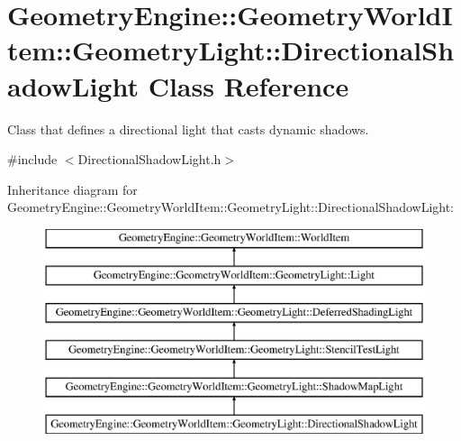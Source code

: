 \hypertarget{class_geometry_engine_1_1_geometry_world_item_1_1_geometry_light_1_1_directional_shadow_light}{}\section{Geometry\+Engine\+::Geometry\+World\+Item\+::Geometry\+Light\+::Directional\+Shadow\+Light Class Reference}
\label{class_geometry_engine_1_1_geometry_world_item_1_1_geometry_light_1_1_directional_shadow_light}


Class that defines a directional light that casts dynamic shadows.  




{\ttfamily \#include $<$Directional\+Shadow\+Light.\+h$>$}

Inheritance diagram for Geometry\+Engine\+::Geometry\+World\+Item\+::Geometry\+Light\+::Directional\+Shadow\+Light\+:\begin{figure}[H]
\begin{center}
\leavevmode
\includegraphics[height=6.000000cm]{class_geometry_engine_1_1_geometry_world_item_1_1_geometry_light_1_1_directional_shadow_light}
\end{center}
\end{figure}
